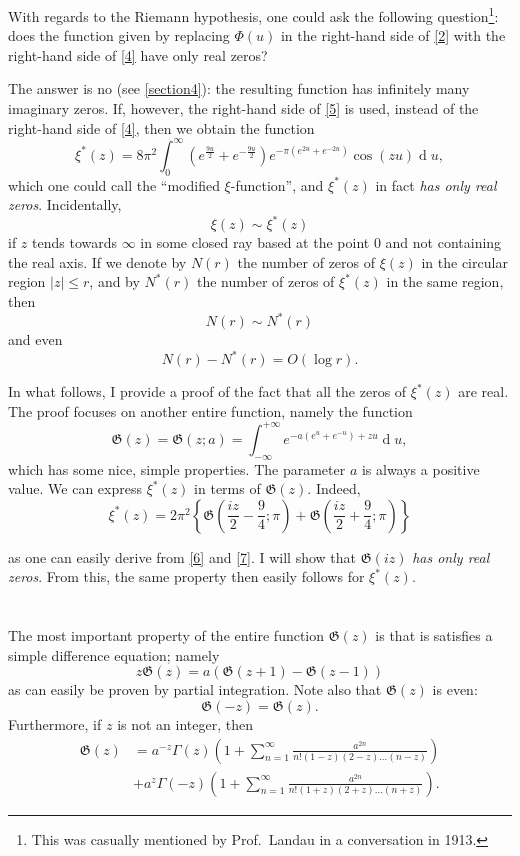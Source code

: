 \documentclass{article}
\theoremstyle{plain}
\newcommand{\dd}{\operatorname{d}\!}
\newcommand{\GG}{\mathfrak{G}}
\renewcommand{\leq}{\leqslant}
\newcommand{\oldpage}[1]{\marginpar{\footnotesize$\Big\vert$ \textit{p.~#1}}}
\begin{document}
\oldpage{306}
With regards to the Riemann hypothesis, one could ask the following question\footnote{This was casually mentioned by Prof.~Landau in a conversation in 1913.}: does the function given by replacing $\Phi(u)$ in the right-hand side of \cref{2} with the right-hand side of \cref{4} have only real zeros?

The answer is no (see \cref{section4}): the resulting function has infinitely many imaginary zeros.
If, however, the right-hand side of \cref{5} is used, instead of the right-hand side of \cref{4}, then we obtain the function
\[
\label{6}
  \xi^*(z) = 8\pi^2 \int_0^\infty \left(
    e^{\frac{9u}{2}} + e^{-\frac{9u}{2}}
  \right) e^{-\pi(e^{2u}+e^{-2u})} \cos(zu) \dd u,
\tag{6}
\]
which one could call the ``modified $\xi$-function'', and $\xi^*(z)$ in fact \emph{has only real zeros}.
Incidentally,
\[
  \xi(z) \sim \xi^*(z)
\]
if $z$ tends towards $\infty$ in some closed ray based at the point $0$ and not containing the real axis.
If we denote by $N(r)$ the number of zeros of $\xi(z)$ in the circular region $|z|\leq r$, and by $N^*(r)$ the number of zeros of $\xi^*(z)$ in the same region, then
\[
  N(r) \sim N^*(r)
\]
and even
\[
  N(r) - N^*(r) = O(\log r).
\]

In what follows, I provide a proof of the fact that all the zeros of $\xi^*(z)$ are real.
The proof focuses on another entire function, namely the function
\[
\label{7}
  \GG(z) = \GG(z;a) = \int_{-\infty}^{+\infty} e^{-a(e^u+e^{-u})+zu} \dd u,
\tag{7}
\]
which has some nice, simple properties.
The parameter $a$ is always a positive value.
We can express $\xi^*(z)$ in terms of $\GG(z)$.
Indeed,
\[
\label{8}
  \xi^*(z) = 2\pi^2 \left\{
    \GG\left(
      \frac{iz}{2} - \frac94; \pi
    \right) +
    \GG\left(
      \frac{iz}{2} + \frac94; \pi
    \right)
  \right\}
\tag{8}
\]

\oldpage{307}
as one can easily derive from \cref{6} and \cref{7}.
I will show that $\GG(iz)$ \emph{has only real zeros}.
From this, the same property then easily follows for $\xi^*(z)$.


\section{}
\label{section1}

The most important property of the entire function $\GG(z)$ is that is satisfies a simple difference equation;
namely
\[
\label{9}
  z\GG(z) = a(\GG(z+1) - \GG(z-1))
\tag{9}
\]
as can easily be proven by partial integration.
Note also that $\GG(z)$ is even:
\[
\label{10}
  \GG(-z) = \GG(z).
\tag{10}
\]
Furthermore, if $z$ is not an integer, then
\[
\label{11}
  \begin{aligned}
    \GG(z)
    &= a^{-z}\Gamma(z) \left(
      1 + \sum_{n=1}^\infty \frac{a^{2n}}{n!(1-z)(2-z)\ldots(n-z)}
    \right)
  \\&+ a^z\Gamma(-z) \left(
      1 + \sum_{n=1}^\infty \frac{a^{2n}}{n!(1+z)(2+z)\ldots(n+z)}
    \right).
  \end{aligned}
\tag{11}
\]
\end{document}
